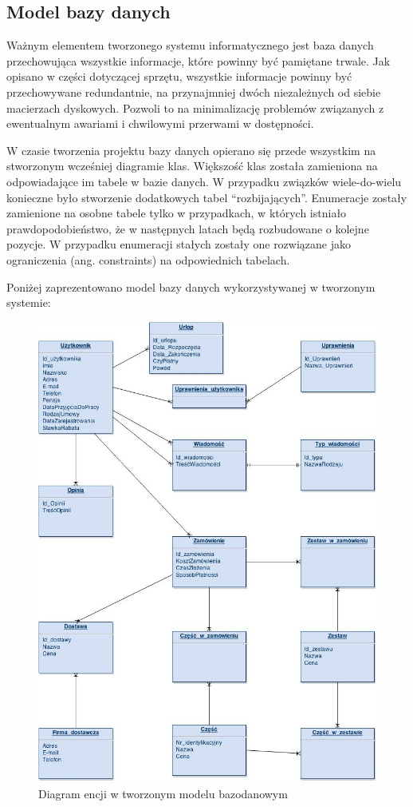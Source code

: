\subsection{Model bazy danych}

Ważnym elementem tworzonego systemu informatycznego jest baza danych
przechowująca wszystkie informacje, które powinny być pamiętane trwale. Jak
opisano w części dotyczącej sprzętu, wszystkie informacje powinny być
przechowywane redundantnie, na przynajmniej dwóch niezależnych od siebie
macierzach dyskowych. Pozwoli to na minimalizację problemów związanych z
ewentualnym awariami i chwilowymi przerwami w dostępności.

W czasie tworzenia projektu bazy danych opierano się przede wszystkim na
stworzonym wcześniej diagramie klas. Większość klas została zamieniona na
odpowiadające im tabele w bazie danych. W przypadku związków wiele-do-wielu
konieczne było stworzenie dodatkowych tabel ``rozbijających''. Enumeracje
zostały zamienione na osobne tabele tylko w przypadkach, w których
istniało prawdopodobieństwo, że w następnych latach będą rozbudowane o kolejne
pozycje. W przypadku enumeracji stałych zostały one rozwiązane jako ograniczenia
(ang. constraints) na odpowiednich tabelach.

Poniżej zaprezentowano model bazy danych wykorzystywanej w tworzonym systemie:

\clearpage
\begin{figure}[h!]
  \centering
    \includegraphics[width=\textwidth,
    height=0.9\textheight]{graphics/Entity_Diagram.jpg}
  \caption{Diagram encji w tworzonym modelu bazodanowym}
\end{figure}


